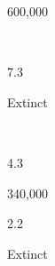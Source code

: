 \begin{description}[font=\normalfont,style=nextline]
\begin{multicols}{2}
\begin{description}[font=\normalfont\itshape,noitemsep]
\item[\nativespeakers] 600,000 
 \item[\region] \regionLiguria\ \Brackets{\regionItaly} 
 \end{description}\end{multicols}
\item[\langnameLuiseno] 
 \begin{multicols}{2}\begin{description}[font=\normalfont\itshape,noitemsep] 
 \item[] 
 \item[\pbnumberabbr] 7.3 
 \item[\family] \famUtoAztecan 
 \item[]
\item[\nativespeakers] Extinct 
 \item[\region] \regionSCalifornia\ \Brackets{\regionUSA} 
 \end{description}\end{multicols}
\item[\langnameLunyole] 
 \begin{multicols}{2}\begin{description}[font=\normalfont\itshape,noitemsep] 
 \item[] 
 \item[\pbnumberabbr] 4.3 
 \item[\family] \famNigerCongo 
 \item[]
\item[\nativespeakers] 340,000 
 \item[\region] \regionUganda 
 \end{description}\end{multicols}
\item[\langnameLuwian] 
 \begin{multicols}{2}\begin{description}[font=\normalfont\itshape,noitemsep] 
 \item[] 
 \item[\pbnumberabbr] 2.2 
 \item[\family] \famIndoEuropean 
 \item[]
\item[\nativespeakers] Extinct 
 \item[\region] \regionHittiteEmpire 
 \end{description}\end{multicols}
\item[\langnameMalagasy] 
 \begin{multicols}{2}\begin{description}[font=\normalfont\itshape,noitemsep] 

\end{description}
\end{multicols}
\end{description}
